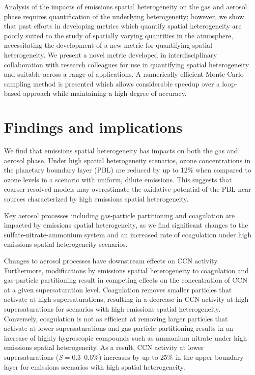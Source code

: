 Analysis of the impacts of emissions spatial heterogeneity on the gas and aerosol phase requires quantification of the underlying heterogeneity; however, we show that past efforts in developing metrics which quantify spatial heterogeneity are poorly suited to the study of spatially varying quantities in the atmosphere, necessitating the development of a new metric for quantifying spatial heterogeneity. We present a novel metric developed in interdisciplinary collaboration with research colleagues for use in quantifying spatial heterogeneity and suitable across a range of applications. A numerically efficient Monte Carlo sampling method is presented which allows considerable speedup over a loop-based approach while maintaining a high degree of accuracy. 

\section{Findings and implications}

We find that emissions spatial heterogeneity has impacts on both the gas and aerosol phase. Under high spatial heterogeneity scenarios, ozone concentrations in the planetary boundary layer (PBL) are reduced by up to 12\% when compared to ozone levels in a scenario with uniform, dilute emissions. This suggests that coarser-resolved models may overestimate the oxidative potential of the PBL near sources characterized by high emissions spatial heterogeneity. 

Key aerosol processes including gas-particle partitioning and coagulation are impacted by emissions spatial heterogeneity, as we find significant changes to the sulfate-nitrate-ammonium system and an increased rate of coagulation under high emissions spatial heterogeneity scenarios. 

Changes to aerosol processes have downstream effects on CCN activity. Furthermore, modifications by emissions spatial heterogeneity to coagulation and gas-particle partitioning result in competing effects on the concentration of CCN at a given supersaturation level. Coagulation removes smaller particles that activate at high supersaturations, resulting in a decrease in CCN activity at high supersaturations for scenarios with high emissions spatial heterogeneity. Conversely, coagulation is not as efficient at removing larger particles that activate at lower supersaturations and gas-particle partitioning results in an increase of highly hygroscopic compounds such as ammonium nitrate under high emissions spatial heterogeneity. As a result, CCN activity at lower supersaturations ($S=0.3\mbox{--}0.6\%$) increases by up to 25\% in the upper boundary layer for emissions scenarios with high spatial heterogeneity. 

